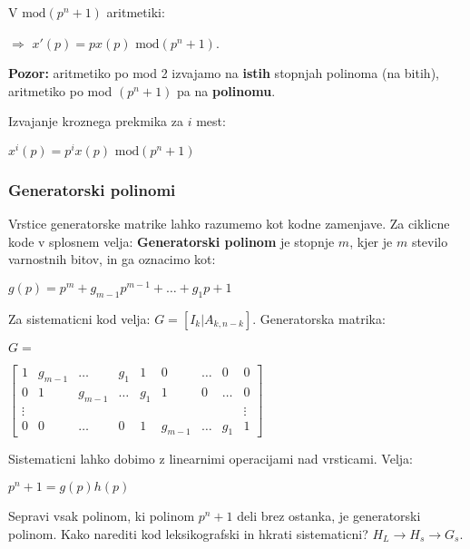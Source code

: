 \documentclass{article}
\begin{document}
\begin{multicols}{4}
V $\text{mod}(p^n + 1)$ aritmetiki:
\begin{center}
    $\Rightarrow$ $x'(p) = px(p) \text{ mod}(p^n + 1)$.
\end{center}

\textbf{Pozor:} aritmetiko po mod 2 izvajamo na \textbf{istih} stopnjah polinoma (na bitih), aritmetiko
po mod $(p^n + 1)$ pa na \textbf{polinomu}.

Izvajanje kroznega prekmika za $i$ mest:
\begin{center}
    \begin{math}
        x^i(p) = p^i x(p) \text{ mod} (p^n + 1)
    \end{math}
\end{center}

\subsubsection{Generatorski polinomi}
Vrstice generatorske matrike lahko razumemo kot kodne zamenjave.
Za ciklicne kode v splosnem velja: \textbf{Generatorski polinom} je stopnje $m$, kjer je $m$ stevilo
varnostnih bitov, in ga oznacimo kot:
\begin{center}
    \begin{math}
        g(p) = p^m + g_{m-1}p^{m-1} + \dots + g_1p + 1
    \end{math}
\end{center}
Za sistematicni kod velja: $G = [I_k | A_{k, n-k}]$.
Generatorska matrika:
\begin{center}
    $G= $
    \begin{tiny}
        \begin{math}
            \begin{bmatrix}
                1 & g_{m - 1} &  \dots & g_1 & 1 & 0 & \dots & 0 & 0 \\
                0 & 1         & g_{m-1} & \dots & g_1 & 1 & 0 & \dots & 0 \\
                \vdots & & & & & & & & \vdots  \\
                0 & 0 & \dots & 0 & 1 & g_{m-1} & \dots & g_1 & 1
            \end{bmatrix}
        \end{math}
    \end{tiny}
\end{center}
Sistematicni lahko dobimo z linearnimi operacijami nad vrsticami.
Velja:
\begin{center}
    \begin{math}
        p^n + 1 = g(p)h(p)
    \end{math}
\end{center}
Sepravi vsak polinom, ki polinom $p^n + 1$ deli brez ostanka, je generatorski polinom.
Kako narediti kod leksikografski in hkrati sistematicni? $H_L \rightarrow H_s \rightarrow G_s$.


\end{multicols}
\end{document}
